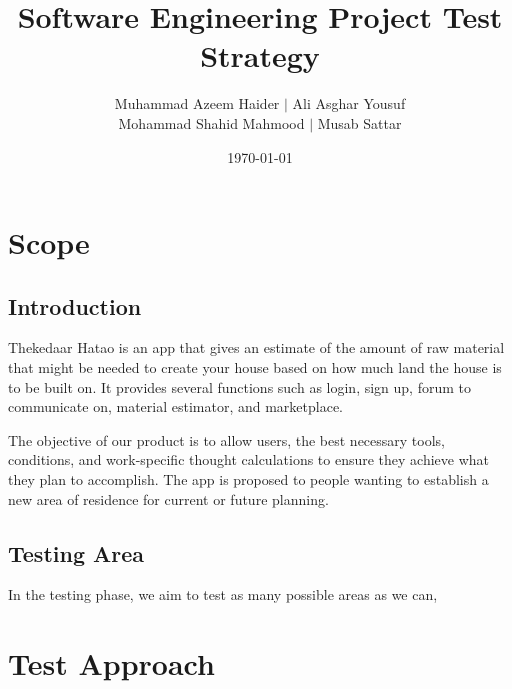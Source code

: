 \documentclass[title page]{article}
\title{Software Engineering Project Test Strategy}
\author{Muhammad Azeem Haider $\mid$ Ali Asghar Yousuf \\
      Mohammad Shahid Mahmood $\mid$ Musab Sattar}
\date{\today}
\begin{document}
\clearpage\maketitle
\thispagestyle{empty}
\newpage
\setcounter{page}{1}
\tableofcontents


\newpage
{} %


\maketitle

\section{Scope}
\subsection{Introduction}

Thekedaar Hatao is an app that gives an estimate of the amount of raw material that might be needed to create your house based on how much land the house is to be built on. It provides several functions such as login, sign up, forum to communicate on, material estimator, and marketplace.

The objective of our product is to allow users, the best necessary tools, conditions, and work-specific thought calculations to ensure they achieve what they plan to accomplish. The app is proposed to people wanting to establish a new area of residence for current or future planning. 

\subsection{Testing Area}
In the testing phase, we aim to test as many possible areas as we can, 



\section{Test Approach}
\end{document}
